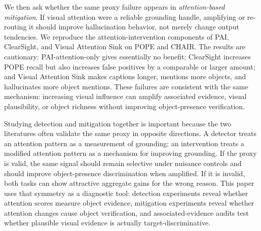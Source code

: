 \documentclass[letterpaper]{article} \usepackage[submission]{aaai2027}  \usepackage[hyphens]{url}  \usepackage{graphicx} \urlstyle{rm} \def\UrlFont{\rm}  \usepackage{natbib}  \usepackage{caption} \frenchspacing
\begin{document}
We then ask whether the same proxy failure appears in \emph{attention-based mitigation}. If visual attention were a reliable grounding handle, amplifying or re-routing it should improve hallucination behavior, not merely change output tendencies. We reproduce the attention-intervention components of PAI, ClearSight, and Visual Attention Sink on POPE and CHAIR. The results are cautionary: PAI-attention-only gives essentially no benefit; ClearSight increases POPE recall but also increases false positives by a comparable or larger amount; and Visual Attention Sink makes captions longer, mentions more objects, and hallucinates more object mentions. These failures are consistent with the same mechanism: increasing visual influence can amplify associated evidence, visual plausibility, or object richness without improving object-presence verification.

Studying detection and mitigation together is important because the two literatures often validate the same proxy in opposite directions. A detector treats an attention pattern as a measurement of grounding; an intervention treats a modified attention pattern as a mechanism for improving grounding. If the proxy is valid, the same signal should remain selective under nuisance controls and should improve object-presence discrimination when amplified. If it is invalid, both tasks can show attractive aggregate gains for the wrong reason. This paper uses that symmetry as a diagnostic tool: detection experiments reveal whether attention scores measure object evidence, mitigation experiments reveal whether attention changes cause object verification, and associated-evidence audits test whether plausible visual evidence is actually target-discriminative.
\end{document}
